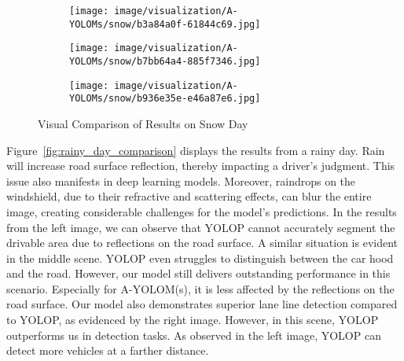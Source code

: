 \documentclass[lettersize,journal]{IEEEtran}
\begin{document}
\begin{figure*}[!h]
    \begin{subfigure}[b]{0.05\textwidth}
        \centering
        \vspace{0.1cm}
    \end{subfigure}\begin{subfigure}{0.25\textwidth}
        \centering
        \texttt{[image: image/visualization/A-YOLOMs/snow/b3a84a0f-61844c69.jpg]}
    \end{subfigure}\hspace{0.5cm}
    \begin{subfigure}{0.25\textwidth}
        \centering
        \texttt{[image: image/visualization/A-YOLOMs/snow/b7bb64a4-885f7346.jpg]}
    \end{subfigure}\hspace{0.5cm}
    \begin{subfigure}{0.25\textwidth}
        \centering
        \texttt{[image: image/visualization/A-YOLOMs/snow/b936e35e-e46a87e6.jpg]}
    \end{subfigure}
    \caption{Visual Comparison of Results on Snow Day}
    \label{fig:snow_day_comparison}
\end{figure*}

Figure~\ref{fig:rainy_day_comparison} displays the results from a rainy day. Rain will increase road surface reflection, thereby impacting a driver's judgment. This issue also manifests in deep learning models. Moreover, raindrops on the windshield, due to their refractive and scattering effects, can blur the entire image, creating considerable challenges for the model's predictions. In the results from the left image, we can observe that YOLOP cannot accurately segment the drivable area due to reflections on the road surface. A similar situation is evident in the middle scene. YOLOP even struggles to distinguish between the car hood and the road. However, our model still delivers outstanding performance in this scenario. Especially for A-YOLOM(s), it is less affected by the reflections on the road surface. Our model also demonstrates superior lane line detection compared to YOLOP, as evidenced by the right image. However, in this scene, YOLOP outperforms us in detection tasks. As observed in the left image, YOLOP can detect more vehicles at a farther distance.
\end{document}
